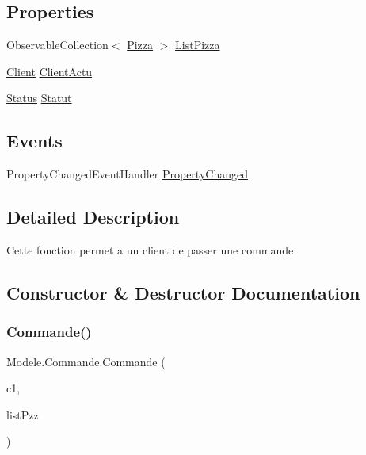 \subsection*{Properties}
\begin{DoxyCompactItemize}
\item 
Observable\+Collection$<$ \hyperlink{classModele_1_1Pizza}{Pizza} $>$ \hyperlink{classModele_1_1Commande_a296c71bf31f1e6383e63d842ceb0bfe6}{List\+Pizza}
\item 
\hyperlink{classModele_1_1Client}{Client} \hyperlink{classModele_1_1Commande_ad9f1418f7febfa94bcb57873d3ac6be4}{Client\+Actu}
\item 
\hyperlink{namespaceModele_a7de67c7bf55b42ee1c5fea81ed793eb1}{Status} \hyperlink{classModele_1_1Commande_af468b3432c93b1c7929b2af8154386a6}{Statut}
\end{DoxyCompactItemize}
\subsection*{Events}
\begin{DoxyCompactItemize}
\item 
Property\+Changed\+Event\+Handler \hyperlink{classModele_1_1Commande_a6022a80a486b9612bb124e6fef5a3373}{Property\+Changed}
\end{DoxyCompactItemize}


\subsection{Detailed Description}
Cette fonction permet a un client de passer une commande 



\subsection{Constructor \& Destructor Documentation}
\mbox{\label{classModele_1_1Commande_a998dd9a12105bc2fe0f78764a8eb2306}} 
\subsubsection{\texorpdfstring{Commande()}{Commande()}}
{\footnotesize\ttfamily Modele.\+Commande.\+Commande (\begin{DoxyParamCaption}\item[{\hyperlink{classModele_1_1Client}{Client}}]{c1,  }\item[{Observable\+Collection$<$ \hyperlink{classModele_1_1Pizza}{Pizza} $>$}]{list\+Pzz }\end{DoxyParamCaption})\hspace{0.3cm}{\ttfamily [inline]}}



